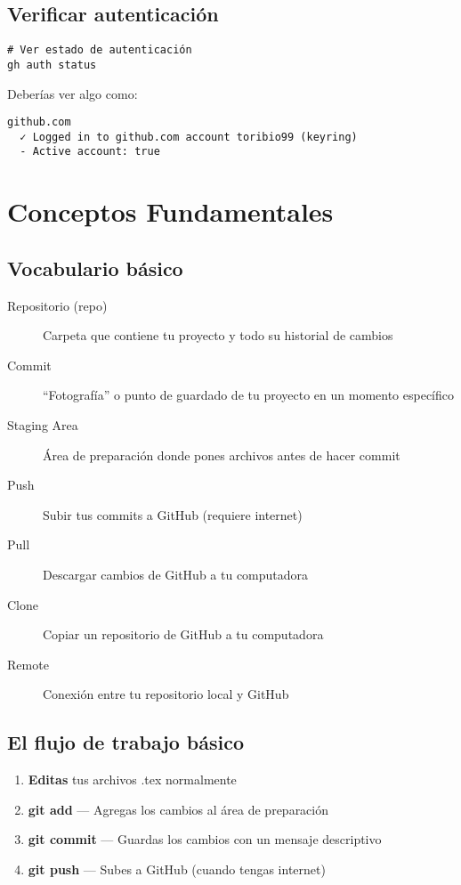 \documentclass[11pt,a4paper]{article}
\begin{document}
\subsection{Verificar autenticación}

\begin{lstlisting}[style=bashstyle]
# Ver estado de autenticación
gh auth status
\end{lstlisting}

Deberías ver algo como:
\begin{lstlisting}[style=bashstyle]
github.com
  ✓ Logged in to github.com account toribio99 (keyring)
  - Active account: true
\end{lstlisting}

\section{Conceptos Fundamentales}

\subsection{Vocabulario básico}

\begin{description}
  \item[Repositorio (repo)] Carpeta que contiene tu proyecto y todo su historial de cambios
  \item[Commit] ``Fotografía'' o punto de guardado de tu proyecto en un momento específico
  \item[Staging Area] Área de preparación donde pones archivos antes de hacer commit
  \item[Push] Subir tus commits a GitHub (requiere internet)
  \item[Pull] Descargar cambios de GitHub a tu computadora
  \item[Clone] Copiar un repositorio de GitHub a tu computadora
  \item[Remote] Conexión entre tu repositorio local y GitHub
\end{description}

\subsection{El flujo de trabajo básico}

\begin{infobox}
\begin{enumerate}
  \item \textbf{Editas} tus archivos .tex normalmente
  \item \textbf{git add} --- Agregas los cambios al área de preparación
  \item \textbf{git commit} --- Guardas los cambios con un mensaje descriptivo
  \item \textbf{git push} --- Subes a GitHub (cuando tengas internet)
\end{enumerate}
\end{infobox}
\end{document}
